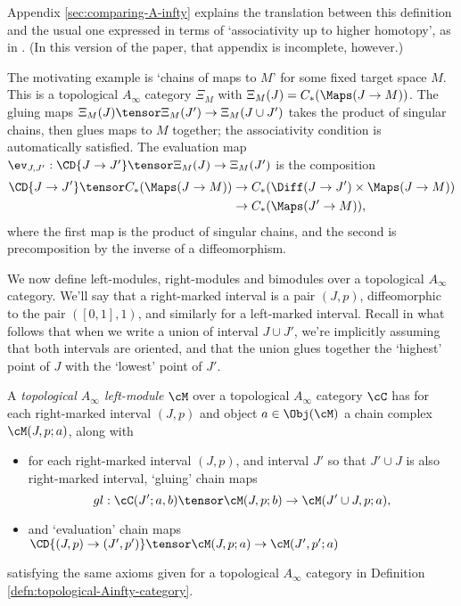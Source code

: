 Appendix \ref{sec:comparing-A-infty} explains the translation between this definition and the usual one expressed in terms of `associativity up to higher homotopy', as in \cite{MR1854636}. (In this version of the paper, that appendix is incomplete, however.)


The motivating example is `chains of maps to $M$' for some fixed target space $M$. This is a topological $A_\infty$ category $\Xi_M$ with $\Xi_M(J) = C_*(\Maps(J \to M))$. The gluing maps $\Xi_M(J) \tensor \Xi_M(J') \to \Xi_M(J \cup J')$  takes the product of singular chains, then glues maps to $M$ together; the associativity condition is automatically satisfied. The evaluation map $\ev_{J,J'} : \CD{J \to J'} \tensor \Xi_M(J) \to \Xi_M(J')$ is the composition
\begin{align*}
\CD{J \to J'} \tensor C_*(\Maps(J \to M)) & \to C_*(\Diff(J \to J') \times \Maps(J \to M)) \\ & \to C_*(\Maps(J' \to M)),
\end{align*}
where the first map is the product of singular chains, and the second is precomposition by the inverse of a diffeomorphism.

We now define left-modules, right-modules and bimodules over a topological $A_\infty$ category. We'll say that a right-marked interval is a pair $(J,p)$, diffeomorphic to the pair $([0,1],1)$, and similarly for a left-marked interval. Recall in what follows that when we write a union of interval $J \cup J'$, we're implicitly assuming that both intervals are oriented, and that the union glues together the `highest' point of $J$ with the `lowest' point of $J'$.

\begin{defn}
\label{defn:topological-Ainfty-module}%
A \emph{topological $A_\infty$ left-module} $\cM$ over a topological $A_\infty$ category $\cC$ has for each right-marked interval $(J,p)$ and object $a \in \Obj(\cM)$ a chain complex $\cM(J,p; a)$, along with
\begin{itemize}
\item for each right-marked interval $(J,p)$, and interval $J'$ so that $J' \cup J$ is also right-marked interval, `gluing' chain maps
$$gl: \cC(J';a,b) \tensor \cM(J,p;b) \to \cM(J' \cup J,p;a),$$
\item and `evaluation' chain maps $\CD{(J,p) \to (J',p')} \tensor \cM(J,p;a) \to \cM(J',p';a)$
\end{itemize}
satisfying the same axioms given for a topological $A_\infty$ category in Definition \ref{defn:topological-Ainfty-category}.
\end{defn}

